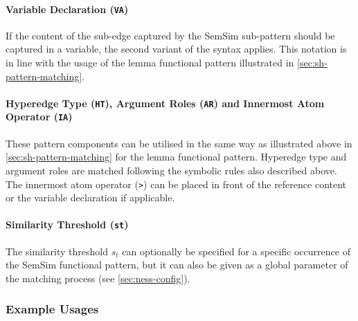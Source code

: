 \documentclass[11pt]{scrreprt}
\begin{document}
\paragraph{Variable Declaration (\texttt{VA})} 
If the content of the sub-edge captured by the SemSim sub-pattern should be captured in a variable, the second variant of the syntax applies. This notation is in line with the usage of the lemma functional pattern illustrated in \cref{sec:sh-pattern-matching}.


\paragraph{Hyperedge Type (\texttt{HT}),  Argument Roles (\texttt{AR}) and Innermost Atom Operator (\texttt{IA})} These pattern components can be utilised in the same way as illustrated above in \cref{sec:sh-pattern-matching} for the lemma functional pattern.
Hyperedge type and argument roles are matched following the symbolic rules also described above. The innermost atom operator (\texttt{>}) can be placed in front of the reference content or the variable declaration if applicable.


\paragraph{Similarity Threshold (\texttt{\gls{st}})}
The similarity threshold \(s_t\) can optionally be specified for a specific occurrence of the SemSim functional pattern, but it can also be given as a global parameter of the matching process (see \cref{sec:ness-config}). 

\subsubsection{Example Usages}
\end{document}
